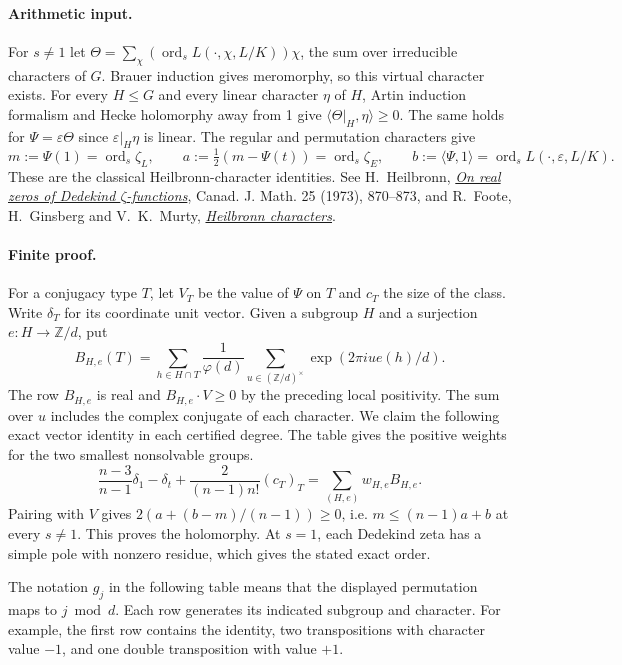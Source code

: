\paragraph{Arithmetic input.}
For $s\ne1$ let $\Theta=\sum_\chi (\operatorname{ord}_{s}L(\cdot,\chi,L/K))\chi$,
the sum over irreducible characters of $G$.
Brauer induction gives meromorphy, so this virtual character exists.
For every $H\le G$ and every linear character $\eta$ of $H$, Artin
induction formalism and Hecke holomorphy away from 1 give
$\langle\Theta|_H,\eta\rangle\ge0$. The same holds for
$\Psi=\varepsilon\Theta$ since $\varepsilon|_H\eta$ is linear.
The regular and permutation characters give
\[
 m:=\Psi(1)=\operatorname{ord}_s\zeta_L,\qquad
 a:=\tfrac12(m-\Psi(t))=\operatorname{ord}_s\zeta_E,\qquad
 b:=\langle\Psi,1\rangle=\operatorname{ord}_s L(\cdot,\varepsilon,L/K).
\]
These are the classical Heilbronn-character identities.
See H.~Heilbronn, \href{https://doi.org/10.4153/CJM-1973-090-3}{\emph{On real
zeros of Dedekind $\zeta$-functions}}, Canad. J. Math. 25 (1973), 870--873,
and R.~Foote, H.~Ginsberg and V.~K.~Murty,
\href{https://doi.org/10.1090/BULL/1492}{\emph{Heilbronn characters}}.

\paragraph{Finite proof.}
For a conjugacy type $T$, let $V_T$ be the value of $\Psi$ on $T$
and $c_T$ the size of the class. Write $\delta_T$ for its coordinate
unit vector. Given a subgroup $H$ and a surjection $e:H\to\mathbb Z/d$,
put
\[
 B_{H,e}(T)=\sum_{h\in H\cap T}\frac1{\varphi(d)}
       \sum_{u\in(\mathbb Z/d)^\times}
                   \exp(2\pi i u e(h)/d).
\]
The row $B_{H,e}$ is real and $B_{H,e}\cdot V\ge0$ by the preceding
local positivity. The sum over $u$ includes the complex conjugate of
each character. We claim the following exact vector identity in each certified degree. The table gives the positive weights for the two smallest nonsolvable groups.
\[
 \frac{n-3}{n-1}\delta_{1}-\delta_t+
             \frac{2}{(n-1)n!}(c_T)_T
       =\sum_{(H,e)} w_{H,e} B_{H,e}.                         \tag{R}
\]
Pairing with $V$ gives $2(a+(b-m)/(n-1))\ge0$, i.e.
$m\le(n-1)a+b$ at every $s\ne1$. This proves the holomorphy.
At $s=1$, each Dedekind zeta has a simple pole with nonzero residue,
which gives the stated exact order.

The notation $g_j$ in the following table means that the displayed
permutation maps to $j\bmod d$. Each row generates its indicated
subgroup and character. For example, the first row contains the identity,
two transpositions with character value $-1$, and one double
transposition with value $+1$.

